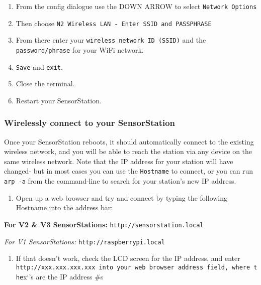 \documentclass[
]{article}
\providecommand{\tightlist}{%
  \setlength{\itemsep}{0pt}\setlength{\parskip}{0pt}}
\begin{document}
\begin{enumerate}
\def\labelenumi{\arabic{enumi}.}
\setcounter{enumi}{7}
\item
  From the config dialogue use the DOWN ARROW to select
  \texttt{Network\ Options}
\item
  Then choose
  \texttt{N2\ Wireless\ LAN\ -\ Enter\ SSID\ and\ PASSPHRASE}
\item
  From there enter your \texttt{wireless\ network\ ID\ (SSID)} and the
  \texttt{password/phrase} for your WiFi network.
\item
  \texttt{Save} and \texttt{exit}.
\item
  Close the terminal.
\item
  Restart your SensorStation.
\end{enumerate}

\hypertarget{wirelessly-connect-to-your-sensorstation}{%
\subsubsection{Wirelessly connect to your
SensorStation}\label{wirelessly-connect-to-your-sensorstation}}

Once your SensorStation reboots, it should automatically connect to the
existing wireless network, and you will be able to reach the station via
any device on the same wireless network. Note that the IP address for
your station will have changed- but in most cases you can use the
\texttt{Hostname} to connect, or you can run \texttt{arp\ -a} from the
command-line to search for your station's new IP address.

\begin{enumerate}
\def\labelenumi{\arabic{enumi}.}
\setcounter{enumi}{13}
\tightlist
\item
  Open up a web browser and try and connect by typing the following
  Hostname into the address bar:
\end{enumerate}

\textbf{For V2 \& V3 SensorStations:}
\texttt{http://sensorstation.local}

\emph{For V1 SensorStations:} \texttt{http://raspberrypi.local}

\begin{enumerate}
\def\labelenumi{\arabic{enumi}.}
\setcounter{enumi}{14}
\tightlist
\item
  If that doesn't work, check the LCD screen for the IP address, and
  enter
  \texttt{http://xxx.xxx.xxx.xxx\textquotesingle{}\ into\ your\ web\ browser\ address\ field,\ where\ the}x`'s
  are the IP address \#s
\end{enumerate}
\end{document}
